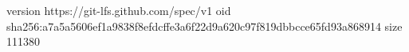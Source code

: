 version https://git-lfs.github.com/spec/v1
oid sha256:a7a5a5606ef1a9838f8efdcffe3a6f22d9a620c97f819dbbcce65fd93a868914
size 111380
